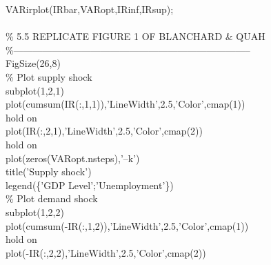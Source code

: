 \hspace{1mm}VARirplot(IRbar,VARopt,IRinf,IRsup); \\ 
\hspace{1mm} \\ 
\hspace{1mm}\textcolor{matlabgreen}{\% 5.5 REPLICATE FIGURE 1 OF BLANCHARD \& QUAH }\\ 
\hspace{1mm}\textcolor{matlabgreen}{\%--------------------------------------------------------------------------  }\\ 
\hspace{1mm}FigSize(26,8) \\ 
\hspace{1mm}\textcolor{matlabgreen}{\% Plot supply shock }\\ 
\hspace{1mm}subplot(1,2,1) \\ 
\hspace{1mm}plot(cumsum(IR(:,1,1)),\textcolor{matlabpurple}{'LineWidth'},2.5,\textcolor{matlabpurple}{'Color'},cmap(1)) \\ 
\hspace{1mm}hold on \\ 
\hspace{1mm}plot(IR(:,2,1),\textcolor{matlabpurple}{'LineWidth'},2.5,\textcolor{matlabpurple}{'Color'},cmap(2)) \\ 
\hspace{1mm}hold on \\ 
\hspace{1mm}plot(zeros(VARopt.nsteps),\textcolor{matlabpurple}{'--k'}) \\ 
\hspace{1mm}title(\textcolor{matlabpurple}{'Supply shock'}) \\ 
\hspace{1mm}legend(\{\textcolor{matlabpurple}{'GDP Level'};'Unemployment'\}) \\ 
\hspace{1mm}\textcolor{matlabgreen}{\% Plot demand shock }\\ 
\hspace{1mm}subplot(1,2,2) \\ 
\hspace{1mm}plot(cumsum(-IR(:,1,2)),\textcolor{matlabpurple}{'LineWidth'},2.5,\textcolor{matlabpurple}{'Color'},cmap(1)) \\ 
\hspace{1mm}hold on \\ 
\hspace{1mm}plot(-IR(:,2,2),\textcolor{matlabpurple}{'LineWidth'},2.5,\textcolor{matlabpurple}{'Color'},cmap(2)) \\ 
